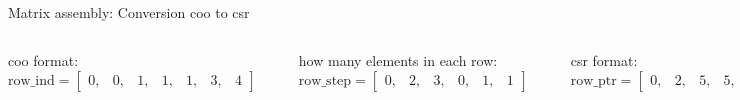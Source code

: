 \documentclass[aspectratio=169,xcolor=dvipsnames]{beamer}
\begin{document}
\begin{frame}{Matrix assembly: Conversion coo to csr}
    \begin{columns}[c] %

coo format: \\
$\mathrm{row\_ind} = \begin{bmatrix}
		0, & 0, & 1, & 1, & 1, & 3, & 4 
		\end{bmatrix}$

\begin{center}
    \includegraphics[width=0.7\linewidth]{conversion1.png}
    \end{center}

how many elements in each row:
$\mathrm{row\_step} = \begin{bmatrix}
		0, & 2, & 3, & 0, & 1, & 1 
		\end{bmatrix}$

\begin{center}
    \includegraphics[width=0.7\linewidth]{conversion2.png}
    \end{center}

csr format: \\
$\mathrm{row\_ptr} = \begin{bmatrix}
		0, & 2, & 5, & 5, & 6, & 7 
		\end{bmatrix}$

        
        $ \left( \begin{array}{rrrrr} 
0 & 5.3 & 0 & 0 & 1.5\\ 
4.2 & 0& 3.1 & 0 & 2\\ 
0 & 0 & 0 & 0 & 0 \\
0 & 0 & 0 & 2.2 & 0 \\
1.9 & 0 & 0 & 0 & 0
\end{array} \right) $

    \end{columns}
\end{frame}
\end{document}
